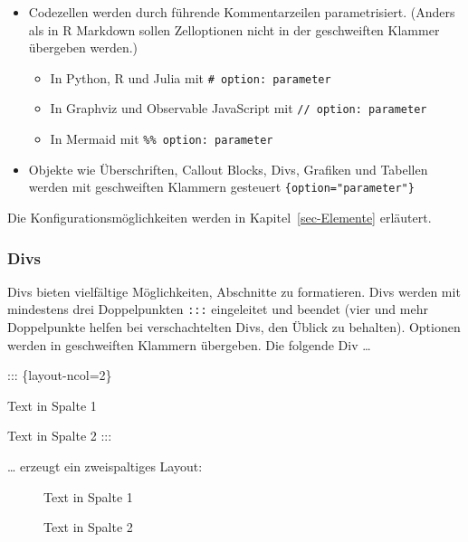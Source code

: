 \documentclass[
  letterpaper,
  DIV=11]{scrartcl}
\newenvironment{Shaded}{\begin{snugshade}}{\end{snugshade}}
\newcommand{\NormalTok}[1]{\textcolor[rgb]{0.00,0.23,0.31}{#1}}
\begin{document}
\begin{itemize}
\item
  Codezellen werden durch führende Kommentarzeilen parametrisiert.
  (Anders als in R Markdown sollen Zelloptionen nicht in der
  geschweiften Klammer übergeben werden.)

  \begin{itemize}
  \item
    In Python, R und Julia mit \texttt{\#\textbar{}\ option:\ parameter}
  \item
    In Graphviz und Observable JavaScript mit
    \texttt{//\textbar{}\ option:\ parameter}
  \item
    In Mermaid mit \texttt{\%\%\textbar{}\ option:\ parameter}
  \end{itemize}
\item
  Objekte wie Überschriften, Callout Blocks, Divs, Grafiken und Tabellen
  werden mit geschweiften Klammern gesteuert
  \texttt{\{option="parameter"\}}
\end{itemize}

Die Konfigurationsmöglichkeiten werden in Kapitel~\ref{sec-Elemente}
erläutert.

\subsubsection{Divs}\label{divs}

Divs bieten vielfältige Möglichkeiten, Abschnitte zu formatieren. Divs
werden mit mindestens drei Doppelpunkten \texttt{:::} eingeleitet und
beendet (vier und mehr Doppelpunkte helfen bei verschachtelten Divs, den
Üblick zu behalten). Optionen werden in geschweiften Klammern übergeben.
Die folgende Div \ldots{}

\begin{Shaded}
\begin{Highlighting}[]
\NormalTok{::: \{layout{-}ncol=2\}}

\NormalTok{Text in Spalte 1}

\NormalTok{Text in Spalte 2}
\NormalTok{:::}
\end{Highlighting}
\end{Shaded}

\ldots{} erzeugt ein zweispaltiges Layout:

\begin{figure}

\begin{minipage}{0.50\linewidth}
Text in Spalte 1\end{minipage}%
%
\begin{minipage}{0.50\linewidth}
Text in Spalte 2\end{minipage}%

\end{figure}%
\end{document}
